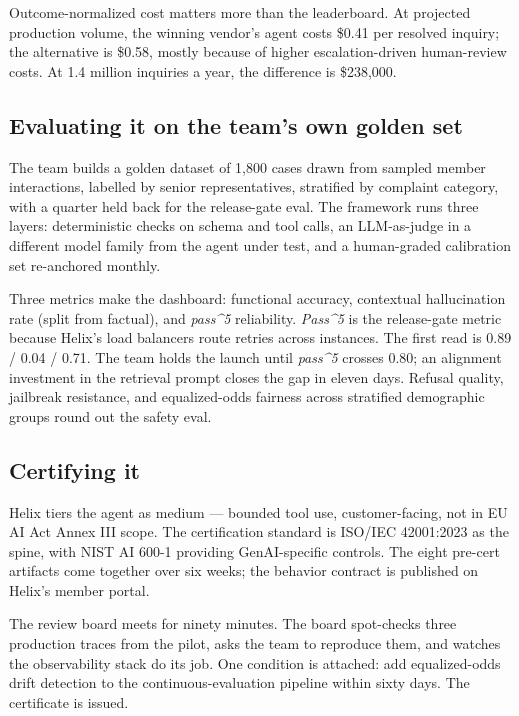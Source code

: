 Outcome-normalized cost matters more than the leaderboard. At projected production volume, the winning vendor's agent costs \$0.41 per resolved inquiry; the alternative is \$0.58, mostly because of higher escalation-driven human-review costs. At 1.4 million inquiries a year, the difference is \$238,000.

\subsection{Evaluating it on the team's own golden set}

The team builds a golden dataset of 1,800 cases drawn from sampled member interactions, labelled by senior representatives, stratified by complaint category, with a quarter held back for the release-gate eval. The framework runs three layers: deterministic checks on schema and tool calls, an LLM-as-judge in a different model family from the agent under test, and a human-graded calibration set re-anchored monthly.

Three metrics make the dashboard: functional accuracy, contextual hallucination rate (split from factual), and \textit{pass\textasciicircum5} reliability. \textit{Pass\textasciicircum5} is the release-gate metric because Helix's load balancers route retries across instances. The first read is 0.89 / 0.04 / 0.71. The team holds the launch until \textit{pass\textasciicircum5} crosses 0.80; an alignment investment in the retrieval prompt closes the gap in eleven days. Refusal quality, jailbreak resistance, and equalized-odds fairness across stratified demographic groups round out the safety eval.

\subsection{Certifying it}

Helix tiers the agent as medium --- bounded tool use, customer-facing, not in EU AI Act Annex III scope. The certification standard is ISO/IEC 42001:2023 as the spine, with NIST AI 600-1 providing GenAI-specific controls. The eight pre-cert artifacts come together over six weeks; the behavior contract is published on Helix's member portal.

The review board meets for ninety minutes. The board spot-checks three production traces from the pilot, asks the team to reproduce them, and watches the observability stack do its job. One condition is attached: add equalized-odds drift detection to the continuous-evaluation pipeline within sixty days. The certificate is issued.

